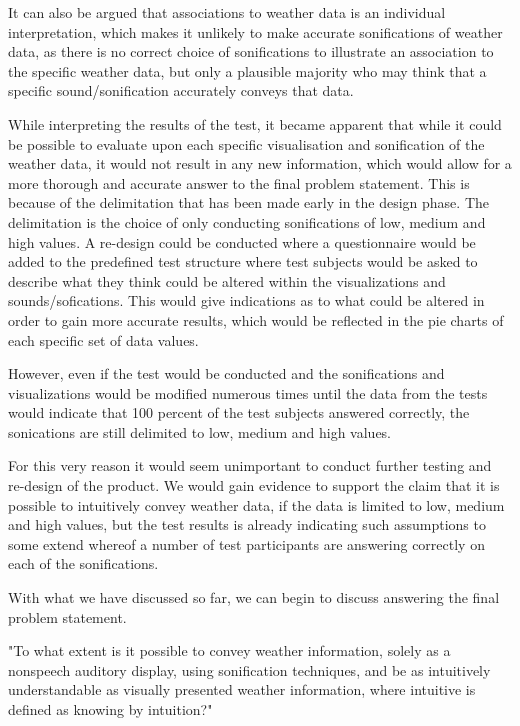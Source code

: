 It can also be argued that associations to weather data is an individual interpretation, which makes it unlikely to make accurate sonifications of weather data, as there is no correct choice of sonifications to illustrate an association to the specific weather data, but only a plausible majority who may think that a specific sound/sonification accurately conveys that data.

While interpreting the results of the test, it became apparent that while it could be possible to evaluate upon each specific visualisation and sonification of the weather data, it would not result in any new information, which would allow for a more thorough and accurate answer to the final problem statement. This is because of the delimitation that has been made early in the design phase. The delimitation is the choice of only conducting sonifications of low, medium and high values. A re-design could be conducted where a questionnaire would be added to the predefined test structure where test subjects would be asked to describe what they think could be altered within the visualizations and sounds/sofications. This would give indications as to what could be altered in order to gain more accurate results, which would be reflected in the pie charts of each specific set of data values.

However, even if the test would be conducted and the sonifications and visualizations would be modified numerous times until the data from the tests would indicate that 100 percent of the test subjects answered correctly, the sonications are still delimited to low, medium and high values. 

For this very reason it would seem unimportant to conduct further testing and re-design of the product. We would gain evidence to support the claim that it is possible to intuitively convey weather data, if the data is limited to low, medium and high values, but the test results is already indicating such assumptions to some extend whereof a number of test participants are answering correctly on each of the sonifications.


With what we have discussed so far, we can begin to discuss answering the final problem statement.


"To what extent is it possible to convey weather information, solely as a nonspeech auditory display, using sonification techniques, and be as intuitively understandable as visually presented weather information, where intuitive is defined as knowing by intuition?"


